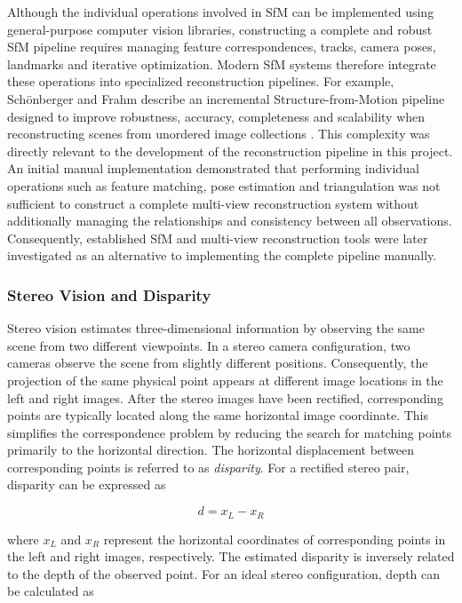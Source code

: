 Although the individual operations involved in SfM can be implemented using general-purpose computer vision libraries, constructing a complete and robust SfM pipeline requires managing feature correspondences, tracks, camera poses, landmarks and iterative optimization. Modern SfM systems therefore integrate these operations into specialized reconstruction pipelines. For example, Schönberger and Frahm describe an incremental Structure-from-Motion pipeline designed to improve robustness, accuracy, completeness and scalability when reconstructing scenes from unordered image collections \cite{schonberger_structure--motion_2016}. This complexity was directly relevant to the development of the reconstruction pipeline in this project. An initial manual implementation demonstrated that performing individual operations such as feature matching, pose estimation and triangulation was not sufficient to construct a complete multi-view reconstruction system without additionally managing the relationships and consistency between all observations. Consequently, established SfM and multi-view reconstruction tools were later investigated as an alternative to implementing the complete pipeline manually.

\subsubsection{Stereo Vision and Disparity}

Stereo vision estimates three-dimensional information by observing the same scene from two different viewpoints. In a stereo camera configuration, two cameras observe the scene from slightly different positions. Consequently, the projection of the same physical point appears at different image locations in the left and right images. After the stereo images have been rectified, corresponding points are typically located along the same horizontal image coordinate. This simplifies the correspondence problem by reducing the search for matching points primarily to the horizontal direction. The horizontal displacement between corresponding points is referred to as \textit{disparity}.
For a rectified stereo pair, disparity can be expressed as

\begin{equation}
d = x_L - x_R
\label{eq:disparity}
\end{equation}

where \(x_L\) and \(x_R\) represent the horizontal coordinates of corresponding points in the left and right images, respectively. The estimated disparity is inversely related to the depth of the observed point. For an ideal stereo configuration, depth can be calculated as


